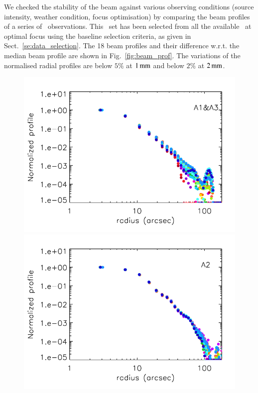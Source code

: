 We checked the stability of the beam against various observing
conditions (source intensity, weather condition, focus optimisation) by
comparing the beam profiles of a series of \bm\ observations.
This \bms\ set has been selected from all the available \bms\ at
optimal focus using the baseline selection criteria, as given in
Sect.~\ref{se:data_selection}.
The 18 beam profiles and their difference w.r.t. the median beam
profile are shown in Fig.~\ref{fig:beam_prof}.
The variations of the normalised radial profiles are below $5\%$ at
$1\,\rm{mm}$ and below $2\%$ at $2\,\rm{mm}$. 

\begin{figure}[!thbp]
  \centering
   \includegraphics[clip, width=\linewidth]{Figures/plot_profiles_1mm.pdf}
   \includegraphics[clip, width=\linewidth]{Figures/plot_profiles_a2.pdf}

\end{figure}

